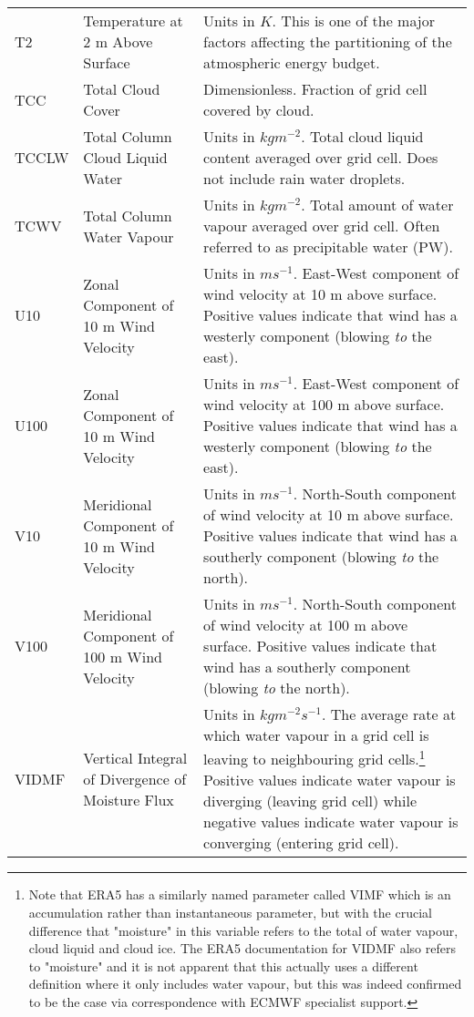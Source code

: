 \begin{landscape}
\begin{longtable}{P{2cm}P{3cm}P{13cm}}
		\acs{T2} & Temperature at 2 m Above Surface & Units in $K$. This is one of the major factors affecting the partitioning of the atmospheric energy budget. \\
		\acs{TCC} & Total Cloud Cover & Dimensionless. Fraction of grid cell covered by cloud. \\
		\acs{TCCLW} & Total Column Cloud Liquid Water & Units in $kg m^{-2}$. Total cloud liquid content averaged over grid cell. Does not include rain water droplets. \\
		\acs{TCWV} & Total Column Water Vapour & Units in $kg m^{-2}$. Total amount of water vapour averaged over grid cell. Often referred to as precipitable water (PW). \\
		\acs{U10} & Zonal Component of 10 m Wind Velocity & Units in $m s^{-1}$. East-West component of wind velocity at 10 m above surface. Positive values indicate that wind has a westerly component (blowing \textit{to} the east). \\
		\acs{U100} & Zonal Component of 10 m Wind Velocity & Units in $m s^{-1}$. East-West component of wind velocity at 100 m above surface. Positive values indicate that wind has a westerly component (blowing \textit{to} the east). \\
		\acs{V10} & Meridional Component of 10 m Wind Velocity & Units in $m s^{-1}$. North-South component of wind velocity at 10 m above surface. Positive values indicate that wind has a southerly component (blowing \textit{to} the north). \\
		\acs{V100} & Meridional Component of 100 m Wind Velocity & Units in $m s^{-1}$. North-South component of wind velocity at 100 m above surface. Positive values indicate that wind has a southerly component (blowing \textit{to} the north). \\
		\acs{VIDMF} & Vertical Integral of Divergence of Moisture Flux & Units in $kg m^{-2} s^{-1}$. The average rate at which water vapour in a grid cell is leaving to neighbouring grid cells.\footnote{Note that \ac{ERA5} has a similarly named parameter called \ac{VIMF} which is an accumulation rather than instantaneous parameter, but with the crucial difference that "moisture" in this variable refers to the total of water vapour, cloud liquid and cloud ice. The ERA5 documentation for \ac{VIDMF} also refers to "moisture" and it is not apparent that this actually uses a different definition where it only includes water vapour, but this was indeed confirmed to be the case via correspondence with \ac{ECMWF} specialist support.} Positive values indicate water vapour is diverging (leaving grid cell) while negative values indicate water vapour is converging (entering grid cell). \\

\end{longtable}
\end{landscape}
